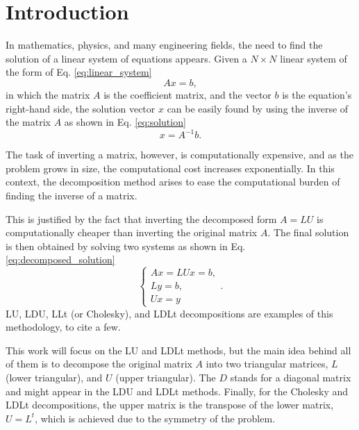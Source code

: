 \section{Introduction} \label{sec:introduction}
In mathematics, physics, and many engineering fields, the need to find the solution of a linear system of equations appears. Given a $N\times N$ linear system of the form of Eq. \eqref{eq:linear_system}
\begin{equation}
    Ax = b,
    \label{eq:linear_system}
\end{equation}
in which the matrix $A$ is the coefficient matrix, and the vector $b$ is the equation's right-hand side, the solution vector $x$ can be easily found by using the inverse of the matrix $A$ as shown in Eq. \eqref{eq:solution}
\begin{equation}
    x = A^{-1}b.
    \label{eq:solution}
\end{equation}

The task of inverting a matrix, however, is computationally expensive, and as the problem grows in size, the computational cost increases exponentially. In this context, the decomposition method arises to ease the computational burden of finding the inverse of a matrix. 

This is justified by the fact that inverting the decomposed form $A=LU$ is computationally cheaper than inverting the original matrix $A$. The final solution is then obtained by solving two systems as shown in Eq. \eqref{eq:decomposed_solution}
\begin{equation}
    \begin{cases}
        Ax = LUx = b, \\
        Ly = b, \\
        Ux = y
    \end{cases}.
    \label{eq:decomposed_solution}
\end{equation}
LU, LDU, LLt (or Cholesky), and LDLt decompositions are examples of this methodology, to cite a few. 

This work will focus on the LU and LDLt methods, but the main idea behind all of them is to decompose the original matrix $A$ into two triangular matrices, $L$ (lower triangular), and $U$ (upper triangular). The $D$ stands for a diagonal matrix and might appear in the LDU and LDLt methods. Finally, for the Cholesky and LDLt decompositions, the upper matrix is the transpose of the lower matrix, $U = L^t$, which is achieved due to the symmetry of the problem.

